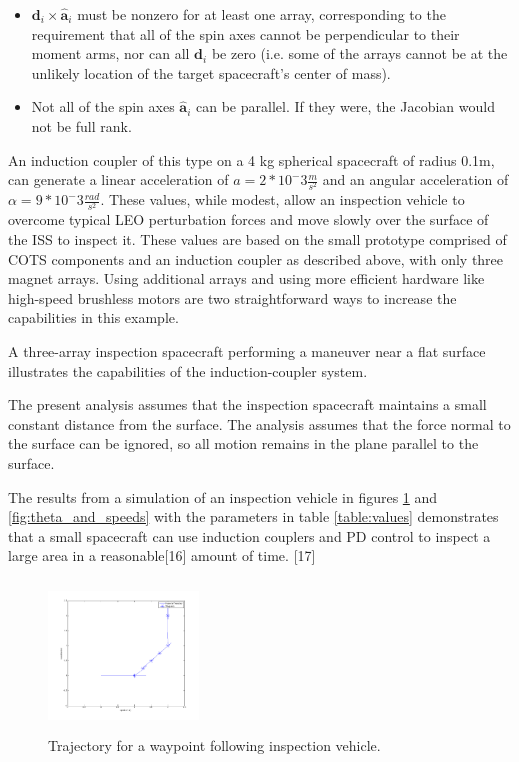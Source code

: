 \begin{itemize}
\item  $\boldsymbol{d}_i{\times}\hat{\boldsymbol{a}}_i$ must be nonzero for at least one array, corresponding to the requirement that all of the spin axes cannot be perpendicular to their moment arms, nor can all $\boldsymbol{d}_i$ be zero (i.e. some of the arrays cannot be at the unlikely location of the target spacecraft's center of mass).
\item  Not all of the spin axes $\hat{\boldsymbol{a}}_i$ can be parallel. If they were, the Jacobian would not be full rank.
\end{itemize}

An induction coupler of this type on a 4 kg spherical spacecraft of radius 0.1m, can generate a linear acceleration of
$a = 2*10^-3 \frac{m}{s^2}$ 
and an angular acceleration of 
$\alpha = 9*10^-3 \frac{rad}{s^2}$. 
These values, while modest, allow an inspection vehicle to overcome typical LEO perturbation forces
 and move slowly over the surface of the ISS to inspect it. These values are based on the small prototype comprised of COTS components and an induction coupler as described above, with only three magnet arrays. Using additional arrays and using more efficient hardware like high-speed brushless motors are two straightforward ways to increase the capabilities in this example.

A three-array inspection spacecraft performing a maneuver near a flat surface illustrates the capabilities of the induction-coupler system. 

The present analysis assumes that the inspection spacecraft maintains a small constant distance from the surface. The analysis assumes that the force normal to the surface can be ignored, so all motion remains in the plane parallel to the surface. 

The results from a simulation of an inspection vehicle in figures \ref{fig:trajectory} and \ref{fig:theta_and_speeds} with the parameters in table \ref{table:values} demonstrates that a small spacecraft can use induction couplers and PD control to inspect a large area in a 
reasonable[16] amount of time. [17]

\begin{figure}

\includegraphics[width = 4cm, height = 4cm ]{figures/planar_trajectory.png}
\caption{Trajectory for a waypoint following inspection vehicle.}
\label{fig:trajectory}
\end{figure}

